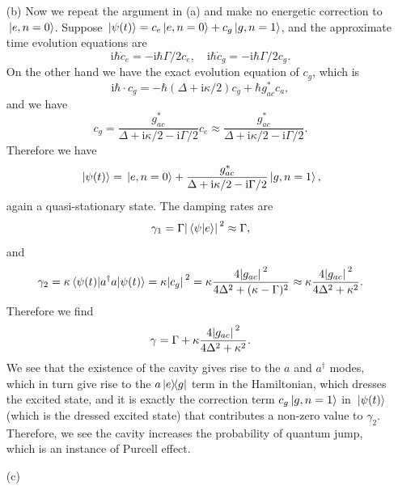 \documentclass[hyperref, a4paper]{article}
\newcommand*{\ii}{\mathrm{i}}
\begin{document}
\begin{itemize}
\item[(b)] Now we repeat the argument in (a) and make no energetic correction to $\ket*{e, n=0}$. Suppose 
$\ket*{\psi(t)} = c_e \ket*{e, n=0} + c_g \ket*{g, n=1}$, and the approximate time evolution equations are 
\[
    \ii \hbar \dot{c}_e = - \ii \hbar \Gamma / 2 c_e, \quad \ii \hbar \dot{c}_g = - \ii \hbar \Gamma / 2 c_g.
\]
On the other hand we have the exact evolution equation of $c_g$, which is 
\[
    \ii \hbar \cdot{c}_g = - \hbar (\Delta + \ii \kappa / 2) c_g + \hbar g_{ac}^* c_a,
\]
and we have 
\[
    c_g = \frac{g_{ac}^*}{\Delta + \ii \kappa / 2 - \ii \Gamma / 2} c_e \approx \frac{g_{ac}^*}{\Delta + \ii \kappa / 2 - \ii \Gamma / 2}.
\]
Therefore we have 
\begin{equation}
    \ket*{\psi(t)} = \ket*{e, n=0} + \frac{g_{ac}^*}{\Delta + \ii \kappa / 2 - \ii \Gamma / 2} \ket*{g, n=1},
\end{equation}
again a quasi-stationary state. The damping rates are 
\begin{equation}
    \gamma_1 = \Gamma \abs*{\braket*{\psi}{e}}^2 \approx \Gamma ,
\end{equation}
and 
\begin{equation}
    \gamma_2 = \kappa \expval*{a^\dagger a}{\psi(t)} = \kappa \abs*{c_g}^2 = \kappa \frac{4 \abs*{g_{ac}}^2}{4 \Delta^2 + (\kappa - \Gamma)^2} \approx \kappa \frac{4 \abs*{g_{ac}}^2}{4 \Delta^2 + \kappa^2} .
\end{equation}
Therefore we find 
\begin{equation}
    \gamma = \Gamma + \kappa \frac{4 \abs*{g_{ac}}^2}{4 \Delta^2 + \kappa^2}.
\end{equation}
We see that the existence of the cavity gives rise to the $a$ and $a^\dagger$ modes, which in turn give rise 
to the $a \dyad*{e}{g}$ term in the Hamiltonian, which dresses the excited state, and it is exactly the 
correction term $c_g \ket*{g, n=1}$ in $\ket*{\psi(t)}$ (which is the dressed excited state) that contributes 
a non-zero value to $\gamma_2$. Therefore, we see the cavity increases the probability of quantum jump, which 
is an instance of Purcell effect.

\item[(c)] 

\end{itemize}
\end{document}
